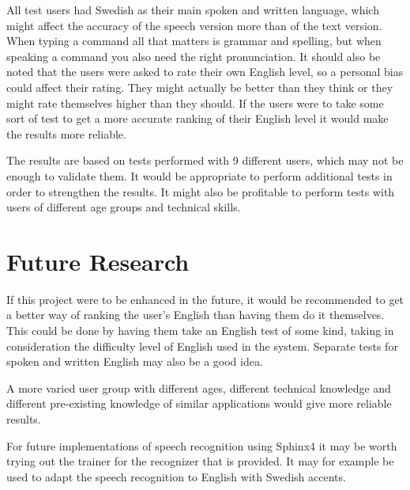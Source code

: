 All test users had Swedish as their main spoken and written language, which might affect the accuracy of the speech version more than of the text version. When typing a command all that matters is grammar and spelling, but when speaking a command you also need the right pronunciation. It should also be noted that the users were asked to rate their own English level, so a personal bias could affect their rating. They might actually be better than they think or they might rate themselves higher than they should. If the users were to take some sort of test to get a more accurate ranking of their English level it would make the results more reliable.

The results are based on tests performed with 9 different users, which may not be enough to validate them. It would be appropriate to perform additional tests in order to strengthen the results. It might also be profitable to perform tests with users of different age groups and technical skills.

\section{Future Research}
If this project were to be enhanced in the future, it would be recommended to get a better way of ranking the user's English than having them do it themselves. This could be done by having them take an English test of some kind, taking in consideration the difficulty level of English used in the system. Separate tests for spoken and written English may also be a good idea.

A more varied user group with different ages, different technical knowledge and different pre-existing knowledge of similar applications would give more reliable results.

For future implementations of speech recognition using Sphinx4 it may be worth trying out the trainer for the recognizer that is provided. It may for example be used to adapt the speech recognition to English with Swedish accents.
